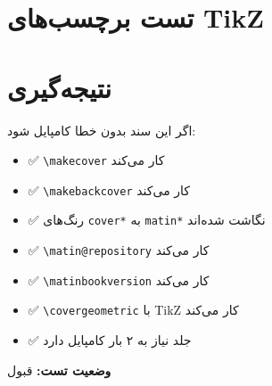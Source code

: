 \documentclass{matinbook}
\begin{document}
\section{تست برچسب‌های TikZ}
\label{sec:tikz-labels}

\begin{latin}
\end{latin}

\section{نتیجه‌گیری}
\label{sec:conclusion}

اگر این سند بدون خطا کامپایل شود:

\begin{itemize}
    \item ✅ \texttt{\textbackslash makecover} کار می‌کند
    \item ✅ \texttt{\textbackslash makebackcover} کار می‌کند
    \item ✅ رنگ‌های \texttt{cover*} به \texttt{matin*} نگاشت شده‌اند
    \item ✅ \texttt{\textbackslash matin@repository} کار می‌کند
    \item ✅ \texttt{\textbackslash matinbookversion} کار می‌کند
    \item ✅ \texttt{\textbackslash covergeometric} با TikZ کار می‌کند
    \item ✅ جلد نیاز به ۲ بار کامپایل دارد
\end{itemize}

\textbf{وضعیت تست:} قبول

\end{document}
